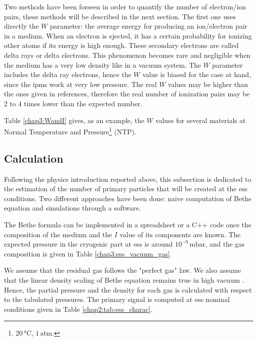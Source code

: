 \begin{refsection}
  Two methods have been forseen in order to quantify the number of electron/ion pairs, these methods will be described in the next section. The first one uses directly the \(W\) parameter: the average energy for producing an ion/electron pair in a medium. When an electron is ejected, it has a certain probability for ionizing other atoms if its energy is high enough. These secondary electrons are called delta rays or delta electrons. This phenomenon becomes rare and negligible when the medium has a very low density like in a vacuum system. The \(W\) parameter includes the delta ray electrons, hence the \(W\) value is biased \cite[p. 470]{Tanabashi2018} for the case at hand, since the \acrshort{ipm}s work at very low pressure. The real \(W\) values may be higher than the ones given in references, therefore the real number of ionization pairs may be $2$ to $4$ times lower than the expected number.

  Table \ref{chap3:WandI} gives, as an example, the \(W\) values for several materials at Normal Temperature and Pressure\footnote{$20\,\mathrm{°C}$, $1\,\mathrm{atm}$.} (NTP).
  

  \subsection{Calculation}
  \label{chap3:calc}
  Following the physics introduction reported above, this subsection is dedicated to the estimation of the number of primary particles that will be created at the \acrshort{ess} conditions. Two different approaches have been done: naive computation of Bethe equation and simulations through a software.

  The Bethe formula can be implemented in a spreadsheet or a C++ code once the composition of the medium and the \(I\) value of its components are known. The expected pressure in the cryogenic part at \acrshort{ess} is around \(10^{-9}\,\mathrm{mbar}\), and the gas composition is given in Table \ref{chap3:ess_vacuum_gas}.
  

  We assume that the residual gas follows the "perfect gas" law. We also assume that the linear density scaling of Bethe equation remains true in high vacuum \cite[p. 108]{egberts2012}\cite{Ishimaru1995}. Hence, the partial pressure and the density for each gas is calculated with respect to the tabulated pressures. The primary signal is computed at \acrshort{ess} nominal conditions given in Table \ref{chap2:tab:ess_charac}.


\end{refsection}

